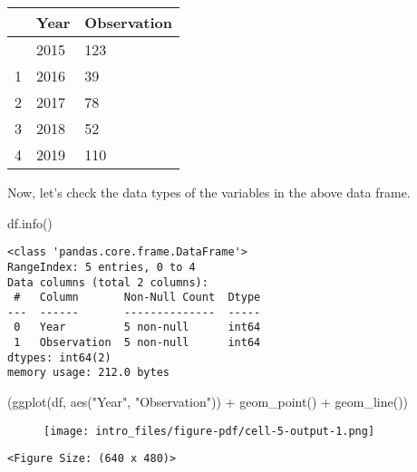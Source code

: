 \documentclass[
  letterpaper,
  DIV=11,
  numbers=noendperiod]{scrreprt}
\newenvironment{Shaded}{\begin{snugshade}}{\end{snugshade}}
\newcommand{\NormalTok}[1]{\textcolor[rgb]{0.00,0.23,0.31}{#1}}
\newcommand{\OperatorTok}[1]{\textcolor[rgb]{0.37,0.37,0.37}{#1}}
\newcommand{\StringTok}[1]{\textcolor[rgb]{0.13,0.47,0.30}{#1}}
\begin{document}
\begin{longtable}[]{@{}lll@{}}
\toprule\noalign{}
& Year & Observation \\
\midrule\noalign{}
\endhead
\bottomrule\noalign{}
\endlastfoot
0 & 2015 & 123 \\
1 & 2016 & 39 \\
2 & 2017 & 78 \\
3 & 2018 & 52 \\
4 & 2019 & 110 \\
\end{longtable}

Now, let's check the data types of the variables in the above data
frame.

\begin{Shaded}
\begin{Highlighting}[]
\NormalTok{df.info()}
\end{Highlighting}
\end{Shaded}

\begin{verbatim}
<class 'pandas.core.frame.DataFrame'>
RangeIndex: 5 entries, 0 to 4
Data columns (total 2 columns):
 #   Column       Non-Null Count  Dtype
---  ------       --------------  -----
 0   Year         5 non-null      int64
 1   Observation  5 non-null      int64
dtypes: int64(2)
memory usage: 212.0 bytes
\end{verbatim}

\begin{Shaded}
\begin{Highlighting}[]
\NormalTok{(ggplot(df, aes(}\StringTok{"Year"}\NormalTok{, }\StringTok{"Observation"}\NormalTok{))}
 \OperatorTok{+}\NormalTok{ geom\_point() }\OperatorTok{+}\NormalTok{ geom\_line())}
\end{Highlighting}
\end{Shaded}

\begin{figure}[H]

{\centering \texttt{[image: intro\_files/figure-pdf/cell-5-output-1.png]}

}

\end{figure}

\begin{verbatim}
<Figure Size: (640 x 480)>
\end{verbatim}

\begin{verbatim}
\end{verbatim}
\end{document}

